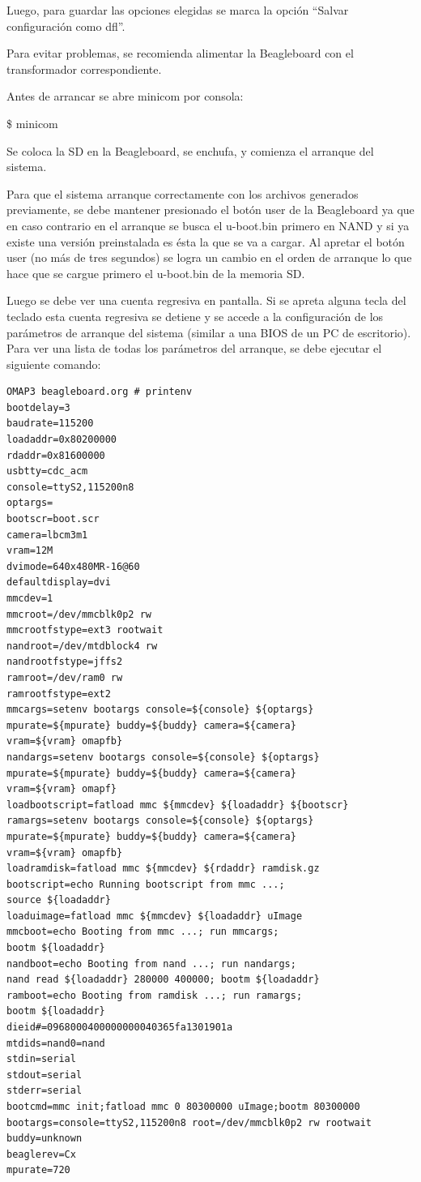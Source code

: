 \bigskip
Luego, para guardar las opciones elegidas se marca la opción “Salvar configuración como dfl”. 

\newpage
{}

\bigskip
Para evitar problemas, se recomienda alimentar la Beagleboard con el transformador correspondiente.

\bigskip
Antes de arrancar se abre minicom por consola: 

\bigskip
\centerline{\$ minicom}

\bigskip
Se coloca la SD en la Beagleboard, se enchufa, y comienza el arranque del sistema. 

Para que el sistema arranque correctamente con los archivos generados previamente, se debe mantener presionado el botón user de la Beagleboard ya que en caso contrario en el arranque se busca el u-boot.bin primero en NAND y si ya existe una versión preinstalada es ésta la que se va a cargar. Al apretar el botón user (no más de tres segundos) se logra un cambio en el orden de arranque lo que hace que se cargue primero el u-boot.bin de la memoria SD.

Luego se debe ver una cuenta regresiva en pantalla. 
Si se apreta alguna tecla del teclado esta cuenta regresiva se detiene y se accede a la configuración de los parámetros de arranque del sistema (similar a una BIOS de un PC de escritorio). Para ver una lista de todas los parámetros del arranque, se debe ejecutar el siguiente comando:

\begin{verbatim}
OMAP3 beagleboard.org # printenv
bootdelay=3 
baudrate=115200 
loadaddr=0x80200000 
rdaddr=0x81600000 
usbtty=cdc_acm 
console=ttyS2,115200n8 
optargs= 
bootscr=boot.scr 
camera=lbcm3m1 
vram=12M 
dvimode=640x480MR-16@60 
defaultdisplay=dvi 
mmcdev=1 
mmcroot=/dev/mmcblk0p2 rw 
mmcrootfstype=ext3 rootwait 
nandroot=/dev/mtdblock4 rw 
nandrootfstype=jffs2 
ramroot=/dev/ram0 rw 
ramrootfstype=ext2 
mmcargs=setenv bootargs console=${console} ${optargs}
mpurate=${mpurate} buddy=${buddy} camera=${camera} 
vram=${vram} omapfb} 
nandargs=setenv bootargs console=${console} ${optargs} 
mpurate=${mpurate} buddy=${buddy} camera=${camera} 
vram=${vram} omapf} 
loadbootscript=fatload mmc ${mmcdev} ${loadaddr} ${bootscr} 
ramargs=setenv bootargs console=${console} ${optargs} 
mpurate=${mpurate} buddy=${buddy} camera=${camera} 
vram=${vram} omapfb} 
loadramdisk=fatload mmc ${mmcdev} ${rdaddr} ramdisk.gz 
bootscript=echo Running bootscript from mmc ...; 
source ${loadaddr} 
loaduimage=fatload mmc ${mmcdev} ${loadaddr} uImage 
mmcboot=echo Booting from mmc ...; run mmcargs; 
bootm ${loadaddr} 
nandboot=echo Booting from nand ...; run nandargs; 
nand read ${loadaddr} 280000 400000; bootm ${loadaddr} 
ramboot=echo Booting from ramdisk ...; run ramargs; 
bootm ${loadaddr} 
dieid#=0968000400000000040365fa1301901a 
mtdids=nand0=nand 
stdin=serial 
stdout=serial 
stderr=serial 
bootcmd=mmc init;fatload mmc 0 80300000 uImage;bootm 80300000 
bootargs=console=ttyS2,115200n8 root=/dev/mmcblk0p2 rw rootwait 
buddy=unknown 
beaglerev=Cx 
mpurate=720
\end{verbatim}

